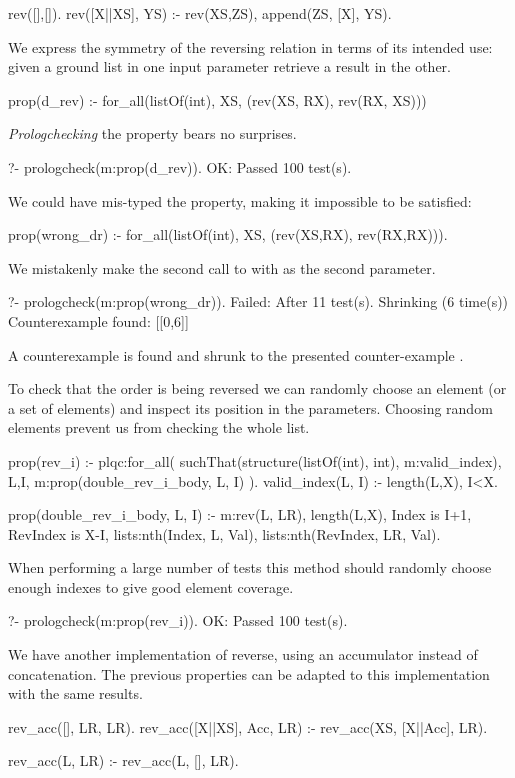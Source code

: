 \begin{yapcode}
 rev([],[]).
 rev([X||XS], YS) :- rev(XS,ZS), append(ZS, [X], YS).
\end{yapcode}
%
We express the symmetry of the reversing relation in terms of
its intended use: given a ground list in one input parameter retrieve a
result in the other.
%
\begin{yapcode}
 prop(d_rev) :- for_all(listOf(int), XS, (rev(XS, RX), rev(RX, XS)))
\end{yapcode}
%
\emph{Prologchecking} the property bears no surprises.
%
\begin{yapcode}
   ?- prologcheck(m:prop(d_rev)).
 OK: Passed 100 test(s).
\end{yapcode}


We could have mis-typed the property, making it impossible to be
satisfied:
%
\begin{yapcode}
 prop(wrong_dr) :-
   for_all(listOf(int), XS, (rev(XS,RX), rev(RX,RX))).
\end{yapcode}
%
We mistakenly make the second call to  with  as
the second parameter.
%
\begin{yapcode}
   ?- prologcheck(m:prop(wrong_dr)).
 Failed: After 11 test(s).
 Shrinking (6 time(s))
 Counterexample found: [[0,6]] 
\end{yapcode}
A counterexample is found and shrunk to the presented counter-example
\yap{[0,6]}.


To check that the order is being reversed we can randomly choose an
element (or a set of elements) and inspect its position in the
parameters.
%
Choosing random elements prevent us from checking the whole list.
%
\begin{yapcode}
 prop(rev_i) :- plqc:for_all(
     suchThat(structure({listOf(int), int}), m:valid_index),
     {L,I}, m:prop({double_rev_i_body, L, I}) ).
 valid_index({L, I}) :- length(L,X), I<X.

 prop({double_rev_i_body, L, I}) :- 
   m:rev(L, LR), length(L,X), Index is I+1, RevIndex is X-I,
   lists:nth(Index, L, Val), lists:nth(RevIndex, LR, Val).
\end{yapcode}
%
When performing a large number of tests this method should randomly
choose enough indexes to give good element coverage.
%
\begin{yapcode}
   ?- prologcheck(m:prop(rev_i)).
 OK: Passed 100 test(s).
\end{yapcode}


We have another implementation of reverse, using an accumulator
 instead
of concatenation.
%
The previous properties can be adapted to this implementation with the
same results.
%
\begin{yapcode}
 rev_acc([], LR, LR).
 rev_acc([X||XS], Acc, LR) :- rev_acc(XS, [X||Acc], LR).

 rev_acc(L, LR) :- rev_acc(L, [], LR).
\end{yapcode}



